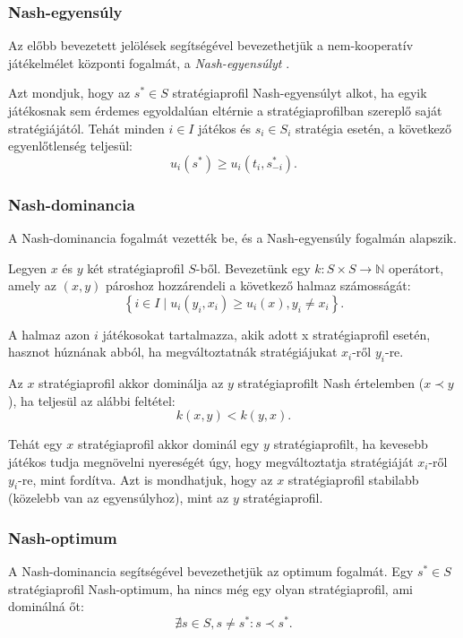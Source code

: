 \subsubsection{Nash-egyensúly}
Az előbb bevezetett jelölések segítségével bevezethetjük a nem-kooperatív játékelmélet központi fogalmát, a \textit{Nash-egyensúlyt} \cite{nash1951non}.

Azt mondjuk, hogy az $s^* \in S$ stratégiaprofil Nash-egyensúlyt alkot,
ha egyik játékosnak sem érdemes egyoldalúan eltérnie a stratégiaprofilban szereplő saját stratégiájától.
Tehát minden $i \in I$ játékos és $s_i \in S_i$ stratégia esetén, a következő egyenlőtlenség teljesül:
\[
  u_i\left(s^*\right) \ge u_i\left(t_i, s_{-i}^*\right).
\]


\subsubsection{Nash-dominancia}
A Nash-dominancia fogalmát  vezették be, és a Nash-egyensúly fogalmán alapszik.

Legyen $x$ és $y$ két stratégiaprofil $S$-ből.
Bevezetünk egy $k \colon S \times S \to \mathbb{N}$ operátort, amely az $\left( x, y \right)$ pároshoz hozzárendeli a következő halmaz számosságát:
\[
  \left\{ i \in I \mid u_i(y_i, x_i) \ge u_i(x), y_i \neq x_i \right\}.
\]

A halmaz azon $i$ játékosokat tartalmazza, akik adott x stratégiaprofil esetén, hasznot húznának abból, ha megváltoztatnák stratégiájukat $x_i$-ről $y_i$-re.

Az $x$ stratégiaprofil akkor dominálja az $y$ stratégiaprofilt Nash értelemben ($x \prec y$), ha teljesül az alábbi feltétel:
\[
  k(x,y) < k(y, x).
\]

Tehát egy $x$ stratégiaprofil akkor dominál egy $y$ stratégiaprofilt, ha kevesebb játékos tudja megnövelni nyereségét úgy, hogy megváltoztatja stratégiáját $x_i$-ről $y_i$-re, mint fordítva.
Azt is mondhatjuk, hogy az $x$ stratégiaprofil stabilabb (közelebb van az egyensúlyhoz), mint az $y$ stratégiaprofil.


\subsubsection{Nash-optimum}
A Nash-dominancia segítségével bevezethetjük az optimum fogalmát.
Egy $s^* \in S$ stratégiaprofil Nash-optimum, ha nincs még egy olyan stratégiaprofil, ami dominálná őt:
\[
  \nexists s \in S, s \neq s^* \colon s \prec s^*.
\]


